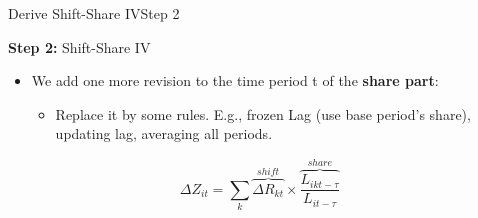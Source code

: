 \documentclass[dvipsnames,hyperref={pdfpagelabels=false}]{beamer}
\begin{document}
\begin{frame}{Derive Shift-Share IV}{Step 2}
	
	\textbf{Step 2:} Shift-Share IV
								\vspace{0.2cm}
	\begin{itemize}
		\item We add one more revision to the time period t of the \textbf{share part}: 
										\vspace{0.2cm}
			\begin{itemize}
		\item Replace it by some rules. E.g., frozen Lag (use base period's share), updating lag, averaging all periods. 
			\end{itemize}
	\end{itemize}
	\[ \Delta Z_{it}=\sum_{k} \overbrace{\Delta R_{kt}}^{shift} \times \overbrace{\frac{L_{ikt-\tau}}{L_{it-\tau}}}^{share} \]
\end{frame}


%
\end{document}
